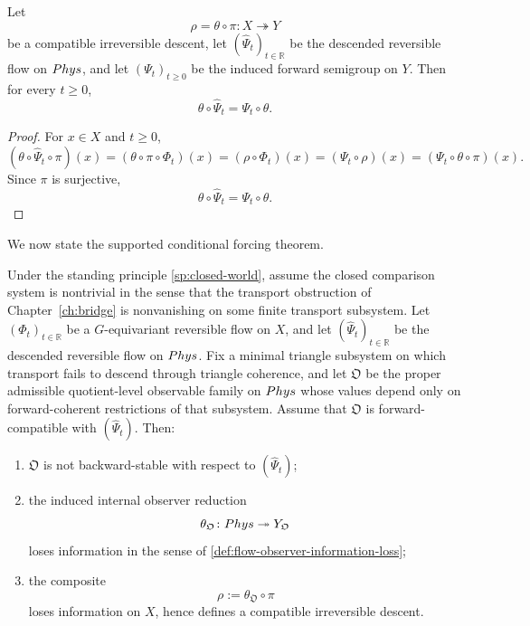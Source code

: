 \begin{lemma}
	\label{lem:flow-factor-identity}
	Let
	\[
		\rho=\theta\circ\pi\colon X\twoheadrightarrow Y
	\]
	be a compatible irreversible descent, let
	\((\widehat\Psi_t)_{t\in\mathbb R}\) be the descended reversible flow on
	\(Phys\), and let
	\((\Psi_t)_{t\ge0}\) be the induced forward semigroup on \(Y\).
	Then for every \(t\ge0\),
	\[
		\theta\circ\widehat\Psi_t=\Psi_t\circ\theta.
	\]
\end{lemma}
\begin{proof}
	For \(x\in X\) and \(t\ge0\),
	\[
		(\theta\circ\widehat\Psi_t\circ\pi)(x)
		=
		(\theta\circ\pi\circ\Phi_t)(x)
		=
		(\rho\circ\Phi_t)(x)
		=
		(\Psi_t\circ\rho)(x)
		=
		(\Psi_t\circ\theta\circ\pi)(x).
	\]
	Since \(\pi\) is surjective,
	\[
		\theta\circ\widehat\Psi_t=\Psi_t\circ\theta.
	\]
\end{proof}
We now state the supported conditional forcing theorem.
\begin{theorem}
	\label{thm:flow-inevitable-loss}
	Under the standing principle \cref{sp:closed-world}, assume the closed
	comparison system is nontrivial in the sense that the
	transport obstruction of Chapter~\ref{ch:bridge} is nonvanishing on some
	finite transport subsystem. Let \((\Phi_t)_{t\in\mathbb R}\) be a
	\(G\)-equivariant reversible flow on \(X\), and let
	\((\widehat\Psi_t)_{t\in\mathbb R}\) be the descended reversible flow on
	\(Phys\). Fix a minimal triangle subsystem on which transport fails to
	descend through triangle coherence, and let \(\mathfrak O\) be the
	proper admissible quotient-level observable family on \(Phys\) whose
	values depend only on forward-coherent restrictions of that subsystem.
	Assume that \(\mathfrak O\) is forward-compatible with
	\((\widehat\Psi_t)\). Then:
	\begin{enumerate}[label=\textup{(\roman*)}]
		\item \(\mathfrak O\) is not backward-stable with respect to
		      \((\widehat\Psi_t)\);
		\item the induced internal observer reduction
		      \[
			      \theta_{\mathfrak O}\colon Phys\twoheadrightarrow Y_{\mathfrak O}
		      \]
		      loses information in the sense of
		      \cref{def:flow-observer-information-loss};
		\item the composite
		      \[
			      \rho:=\theta_{\mathfrak O}\circ\pi
		      \]
		      loses information on \(X\), hence defines a compatible
		      irreversible descent.
	\end{enumerate}
\end{theorem}
